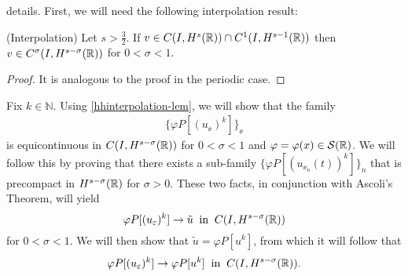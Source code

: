 details. First, we will need the following
interpolation result:
%
%
%
%
\begin{lemma}
\label{hhinterpolation-lem}
(Interpolation)     Let  $s > \frac{3}{2}$.
If $v \in C(I, H^s(\mathbb{R})) \cap C^1(I, H^{s-1}(\mathbb{R}))$
then $v \in C^\sigma (I, H^{s- \sigma}(\mathbb{R}))$ for  $0 < \sigma < 1$.
\end{lemma}
%
\begin{proof} It is analogous to the proof in the periodic case.
\end{proof}
Fix $k \in \mathbb{N}$. Using \cref{hhinterpolation-lem}, we
will show that the family
\begin{equation*}
\begin{split}
\{\varphi P[(u_\ee)^k]\}_\ee
\end{split}
\end{equation*}
is equicontinuous in $C(I, H^{s-\sigma}(\mathbb{R}))$ 
for $0 < \sigma < 1$ and $\varphi = \varphi(x) \in \mathcal{S}(\mathbb{R})$.
We will follow this by proving that
there exists a sub-family $\{\varphi P[(u_{\ee_n}(t))^k]\}_n$
that is precompact in $H^{s-\sigma}(\mathbb{R})$ for $\sigma > 0$. 
These two facts, in conjunction with Ascoli's Theorem, will
yield
\begin{equation*}
\label{hhstrong-conv2}
\varphi P[(u_\varepsilon)^k] \to \tilde{u}
\; \; \text{in} \; \; C(I,H^{s-\sigma}(\mathbb{R}))
\end{equation*}
for $0 < \sigma < 1$.
We will then show that $\tilde{u} = \varphi P[u^k]$, from which it will
follow that
\begin{equation*}
\label{hhphiplus}
\begin{split}
\varphi P[(u_\varepsilon)^k] \to \varphi P[u^k]
\; \; \text{in} \; \; C(I,H^{s-\sigma}(\mathbb{R})).
\end{split}
\end{equation*}
%
%
%
%
%
